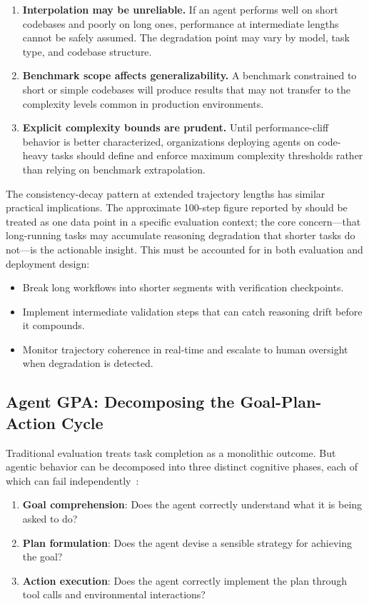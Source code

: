 \begin{enumerate}
    \item \textbf{Interpolation may be unreliable.} If an agent performs well on short codebases and poorly on long ones, performance at intermediate lengths cannot be safely assumed. The degradation point may vary by model, task type, and codebase structure.
    \item \textbf{Benchmark scope affects generalizability.} A benchmark constrained to short or simple codebases will produce results that may not transfer to the complexity levels common in production environments.
    \item \textbf{Explicit complexity bounds are prudent.} Until performance-cliff behavior is better characterized, organizations deploying agents on code-heavy tasks should define and enforce maximum complexity thresholds rather than relying on benchmark extrapolation.
\end{enumerate}

The consistency-decay pattern at extended trajectory lengths has similar practical implications. The approximate 100-step figure reported by \citet{agent_gpa} should be treated as one data point in a specific evaluation context; the core concern---that long-running tasks may accumulate reasoning degradation that shorter tasks do not---is the actionable insight. This must be accounted for in both evaluation and deployment design:
\begin{itemize}
    \item Break long workflows into shorter segments with verification checkpoints.
    \item Implement intermediate validation steps that can catch reasoning drift before it compounds.
    \item Monitor trajectory coherence in real-time and escalate to human oversight when degradation is detected.
\end{itemize}

\subsection{Agent GPA: Decomposing the Goal-Plan-Action Cycle}

Traditional evaluation treats task completion as a monolithic outcome. But agentic behavior can be decomposed into three distinct cognitive phases, each of which can fail independently~\citep{agent_gpa}:

\begin{enumerate}
    \item \textbf{Goal comprehension}: Does the agent correctly understand what it is being asked to do?
    \item \textbf{Plan formulation}: Does the agent devise a sensible strategy for achieving the goal?
    \item \textbf{Action execution}: Does the agent correctly implement the plan through tool calls and environmental interactions?
\end{enumerate}

